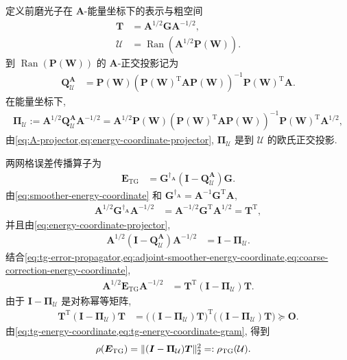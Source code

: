 \documentclass{ctexart}
\newcommand{\T}{\mathrm{T}}
\DeclareMathOperator{\Ran}{Ran}
\DeclarePairedDelimiter\norm{\lVert}{\rVert}
\begin{document}
定义前磨光子在 $\bm A$-能量坐标下的表示与粗空间
\begin{align}
    \bm T&=\bm A^{1/2}\bm G\bm A^{-1/2},
    \label{eq:smoother-energy-coordinate}\\
    \mathcal U&=\Ran(\bm A^{1/2}\bm P(\bm W)).
    \label{eq:energy-coordinate-coarse-space}
\end{align}
到 $\Ran(\bm P(\bm W))$ 的 $\bm A$-正交投影记为
\begin{align}
    \bm Q_{\mathcal U}^{\bm A}
    &=\bm P(\bm W)
      (\bm P(\bm W)^\T\bm A\bm P(\bm W))^{-1}
      \bm P(\bm W)^\T\bm A.
    \label{eq:A-projector}
\end{align}
在能量坐标下,
\begin{align}
    \bm\Pi_{\mathcal U}:=\bm A^{1/2}\bm Q_{\mathcal U}^{\bm A}\bm A^{-1/2}=\bm A^{1/2}\bm P(\bm W)
      (\bm P(\bm W)^\T\bm A\bm P(\bm W))^{-1}
      \bm P(\bm W)^\T\bm A^{1/2},
    \label{eq:energy-coordinate-projector}
\end{align}
由\cref{eq:A-projector,eq:energy-coordinate-projector}, $\bm\Pi_{\mathcal U}$ 是到 $\mathcal U$ 的欧氏正交投影.

两网格误差传播算子为
\begin{align}
    \bm E_{\mathrm{TG}}
    &=\bm G^{\dagger_{\bm A}}
      (\bm I-\bm Q_{\mathcal U}^{\bm A})\bm G.
    \label{eq:tg-error-propagator}
\end{align}
由\cref{eq:smoother-energy-coordinate} 和 $\bm G^{\dagger_{\bm A}}=\bm A^{-1}\bm G^\T\bm A$,
\begin{align}
    \bm A^{1/2}\bm G^{\dagger_{\bm A}}\bm A^{-1/2}
    &=\bm A^{-1/2}\bm G^\T\bm A^{1/2}
     =\bm T^\T,
    \label{eq:adjoint-smoother-energy-coordinate}
\end{align}
并且由\cref{eq:energy-coordinate-projector},
\begin{align}
    \bm A^{1/2}(\bm I-\bm Q_{\mathcal U}^{\bm A})\bm A^{-1/2}
    &=\bm I-\bm\Pi_{\mathcal U}.
    \label{eq:coarse-correction-energy-coordinate}
\end{align}
结合\cref{eq:tg-error-propagator,eq:adjoint-smoother-energy-coordinate,eq:coarse-correction-energy-coordinate},
\begin{align}
    \bm A^{1/2}\bm E_{\mathrm{TG}}\bm A^{-1/2}
    &=\bm T^\T(\bm I-\bm\Pi_{\mathcal U})\bm T.
    \label{eq:tg-energy-coordinate}
\end{align}
由于 $\bm I-\bm\Pi_{\mathcal U}$ 是对称幂等矩阵,
\begin{align}
    \bm T^\T(\bm I-\bm\Pi_{\mathcal U})\bm T
    &=\bigl((\bm I-\bm\Pi_{\mathcal U})\bm T\bigr)^\T
      \bigl((\bm I-\bm\Pi_{\mathcal U})\bm T\bigr)\succeq\mathbf O.
    \label{eq:tg-energy-coordinate-gram}
\end{align}
由\cref{eq:tg-energy-coordinate,eq:tg-energy-coordinate-gram}, 得到
\begin{align}
    \rho(\bm E_{\mathrm{TG}})
    &=\norm{(\bm I-\bm\Pi_{\mathcal U})\bm T}_2^2
     =:\rho_{\mathrm{TG}}(\mathcal U).
    \label{eq:tg-objective-exact}
\end{align}
\end{document}
